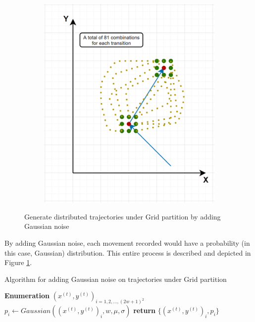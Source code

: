 \documentclass[12pt]{article}
\theoremstyle{definition}
\begin{document}
\begin{figure}
\begin{subfigure}[t]{0.4\textwidth}
    \caption{}
  \end{subfigure}
  
  \begin{subfigure}[t]{0.6\textwidth}
    \centering
    \includegraphics[width=\textwidth]{gaussian_noise_4.jpg}
    \caption{}
  \end{subfigure}
  \caption{Generate distributed trajectories under Grid partition by adding Gaussian noise}
  \label{fig:gaussian_noise}
\end{figure}

By adding Gaussian noise, each movement recorded would have a probability (in this case, Gaussian) distribution. This entire process is described and depicted in Figure \ref{fig:gaussian_noise}. 


\begin{algorithm}
  \caption{Algorithm for adding Gaussian noise on trajectories under Grid partition}
  \label{alg:gauss-noise}
  \begin{algorithmic}
    \State \textbf{Enumeration} \((x^{(t)},y^{(t)})_{i=1,2,...,(2w+1)^2}\) 
    \State \(p_{i} \gets Gaussian((x^{(t)}, y^{(t)})_{i}, w, \mu, \sigma)\)
    \EndFor
    \State \textbf{return} \(\{(x^{(t)}, y^{(t)})_{i}, p_{i}\}\)
    \EndProcedure
  \end{algorithmic}
\end{algorithm}
\end{document}
